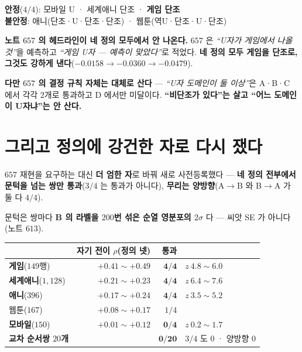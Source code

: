 \documentclass[10pt,a4paper]{article}
\begin{document}
\begin{center}
\textbf{안정}($4/4$): 모바일 U · 세계애니 단조 · \textbf{게임 단조}\\
\textbf{불안정}: 애니(단조·U·단조·단조) · 웹툰(역U·단조·U·단조)
\end{center}

\textbf{노트 $657$ 의 헤드라인이 네 정의 모두에서 안 나온다.} $657$ 은 \emph{``U자가
게임에서 나올 것''}을 예측하고 \emph{``게임 U자 --- 예측이 맞았다''}로 적었다.
\textbf{네 정의 모두 게임을 단조로, 그것도 강하게 낸다}($-0.0158 \to -0.0360 \to
-0.0479$).

\textbf{다만 $657$ 의 결정 규칙 자체는 대체로 산다} --- \emph{``U자 도메인이 둘
이상''}은 A·B·C 에서 각각 $2$개로 통과하고 D 에서만 미달이다. \textbf{``비단조가
있다''는 살고 ``어느 도메인이 U자냐''는 안 산다.}

\section{그리고 정의에 강건한 자로 다시 쟀다}

$657$ 재현을 요구하는 대신 \textbf{더 엄한 자}로 바꿔 새로 사전등록했다 ---
\textbf{네 정의 전부에서 문턱을 넘는 쌍만 통과}($3/4$ 는 통과가 아니다),
\textbf{무리는 양방향}(A$\to$B 와 B$\to$A 가 둘 다 $4/4$).

문턱은 쌍마다 \textbf{B 의 라벨을 $200$번 섞은 순열 영분포의 $2\sigma$} 다 ---
씨앗 SE 가 아니다(노트 $613$).

\begin{center}
\begin{tabular}{lrrl}
\toprule
& 자기 전이 $\rho$(정의 넷) & 통과 & \\
\midrule
\textbf{게임}($149$행) & $+0.41 \sim +0.49$ & $\mathbf{4/4}$ & $z\ 4.8{\sim}6.0$ \\
\textbf{세계애니}($1{,}128$) & $+0.21 \sim +0.23$ & $\mathbf{4/4}$ & $z\ 6.4{\sim}7.6$ \\
\textbf{애니}($396$) & $+0.17 \sim +0.24$ & $\mathbf{4/4}$ & $z\ 3.5{\sim}5.2$ \\
웹툰($167$) & $+0.08 \sim +0.17$ & $1/4$ & \\
\textcolor{BrickRed}{\textbf{모바일}}($150$) & $+0.01 \sim +0.12$ & $\mathbf{0/4}$ & $z\ 0.2{\sim}1.7$ \\
\midrule
\textbf{교차 순서쌍 $20$개} & & \textcolor{BrickRed}{$\mathbf{0/20}$} & $3/4$ 도 $0$ · 양방향 $0$ \\
\bottomrule
\end{tabular}
\end{center}
\end{document}
